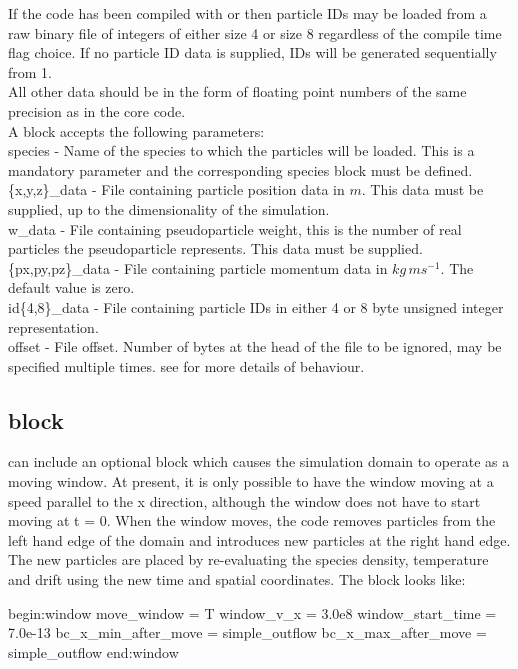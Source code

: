 If the code has been compiled with  or
 then particle IDs may be loaded from a raw binary
file of integers of either size 4 or size 8 regardless of the compile time flag
choice.  If no particle ID data is supplied, IDs will be generated sequentially
from 1.\\

All other data should be in the form of floating point numbers of the same
precision as  in the core {\EPOCH} code.\\

A  block accepts the following parameters:\\

{\emphtext species} - Name of the species to which the particles
will be loaded.  This is a mandatory parameter and the corresponding species
block must be defined.\\

{\emphtext \{x,y,z\}\_data} - File containing particle position data in $m$.
This data must be supplied, up to the dimensionality of the simulation.\\

{\emphtext w\_data} - File containing pseudoparticle weight, this is the number
of real particles the pseudoparticle represents. This data must be supplied.\\

{\emphtext \{px,py,pz\}\_data} - File containing particle momentum data
in $kg\,ms^{-1}$. The default value is zero.\\

{\emphtext id\{4,8\}\_data} - File containing particle IDs in either 4 or 8
byte unsigned integer representation.\\

{\emphtext offset} - File offset. Number of bytes at the head of the file to be
ignored, may be specified multiple times. see  for more
details of behaviour.\\


\subsection{\texorpdfstring
  { block}
  {           {window} block}}
\label{sec:window_block}
{\EPOCH} can include an optional block which causes the simulation domain to
operate as a moving window. At present, it is only possible to have the window
moving at a speed parallel to the x direction, although the window
does not have to start moving at t = 0. When the window moves, the code removes
particles from the left hand edge of the domain and introduces new particles
at the right hand edge. The new particles are placed by re-evaluating the
species density, temperature and drift using the new time and spatial
coordinates. The block looks like:
\begin{boxverbatim}
begin:window
   move_window = T
   window_v_x = 3.0e8
   window_start_time = 7.0e-13
   bc_x_min_after_move = simple_outflow
   bc_x_max_after_move = simple_outflow
end:window
\end{boxverbatim}

